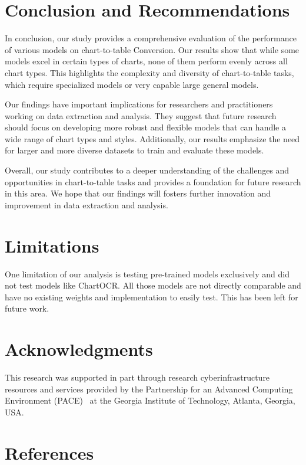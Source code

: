 \documentclass[
	letterpaper, %
]{jdf}
\begin{document}
\section{Conclusion and Recommendations}\label{sect:conclusion}
In conclusion, our study provides a comprehensive evaluation of the performance of various models on chart-to-table Conversion.
Our results show that while some models excel in certain types of charts, none of them perform evenly across all chart types.
This highlights the complexity and diversity of chart-to-table tasks, which require specialized models or very capable large general models.

Our findings have important implications for researchers and practitioners working on data extraction and analysis.
They suggest that future research should focus on developing more robust and flexible models that can handle a wide range  of chart types and styles.
Additionally, our results emphasize the need for larger and more diverse datasets to train and evaluate these models.

Overall, our study contributes to a deeper understanding of the challenges and opportunities in chart-to-table tasks and provides a foundation for future research in this area. 
We hope that our findings will fosters further innovation and improvement in data extraction and analysis.

\section{Limitations}\label{sect:limitations}
One limitation of our analysis is testing pre-trained models exclusively and did not test models like ChartOCR.
All those models are not directly comparable and have no existing weights and implementation to easily test.
This has been left for future work.

\section{Acknowledgments}
This research was supported in part through research cyberinfrastructure resources and services provided by the Partnership for an Advanced Computing Environment (PACE)~\cite{pace2017partnership} at the Georgia Institute of Technology, Atlanta, Georgia, USA.

\section{References}
\printbibliography[heading=none]
\end{document}
